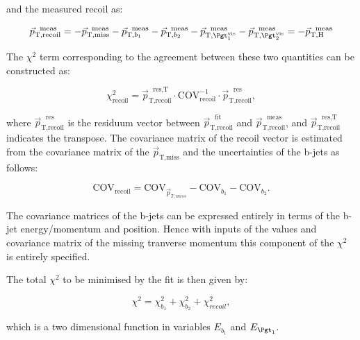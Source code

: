 and the measured recoil as:

\begin{equation}
\vec{p}_{\text{T},\text{recoil}}^{\text{~~meas}} = -
\vec{p}_{\text{T},\text{miss}}^{\text{~~meas}} -
\vec{p}_{\text{T},b_{1}}^{\text{~~meas}} - \vec{p}_{\text{T},b_{2}}^{\text{~~meas}} -
\vec{p}_{\text{T},\Pgt_{1}^{\text{vis}}}^{\text{~~meas}} -
\vec{p}_{\text{T},\Pgt_{2}^{\text{vis}}}^{\text{~~meas}} = -
\vec{p}_{\text{T},\text{H}}^{\text{~~meas}}
\end{equation}

The $\chi^{2}$ term corresponding to the agreement between these two quantities
can be constructed as:

\begin{equation}
\chi_{\text{recoil}}^{2} = \vec{p}_{\text{T},\text{recoil}}^{\text{~~res},\text{T}} \cdot
\text{COV}_{\text{recoil}}^{-1} \cdot
\vec{p}_{\text{T},\text{recoil}}^{\text{~~res}} ,  
\end{equation}

where $\vec{p}_{\text{T},\text{recoil}}^{\text{~~res}}$ is the residuum vector between
$\vec{p}_{\text{T},\text{recoil}}^{\text{~~fit}}$
and $\vec{p}_{\text{T},\text{recoil}}^{\text{~~meas}}$, and
$\vec{p}_{\text{T},\text{recoil}}^{\text{~~res},\text{T}}$ indicates the
transpose. The covariance matrix of the recoil vector is estimated from
the covariance matrix of the $\vec{p}_{\text{T},\text{miss}}$ and the uncertainties of the b-jets as
follows:

\begin{equation}
\text{COV}_{\text{recoil}} = \text{COV}_{\vec{p}_{T,miss}} - \text{COV}_{b_{1}} -
\text{COV}_{b_{2}} .
\end{equation}

The covariance matrices of the b-jets can be expressed entirely in terms of the
b-jet energy/momentum and position. Hence with inputs of the values and
covariance matrix of the missing tranverse momentum this component of the
$\chi^{2}$ is entirely specified. 

The total $\chi^{2}$ to be minimised by the fit is then given by:

\begin{equation}
\chi^{2}= \chi_{b_{1}}^{2} + \chi_{b_{2}}^{2} + \chi_{recoil}^{2},
\end{equation}

which is a two dimensional function in variables $E_{b_{1}}$ and $E_{\Pgt_{1}}$.

